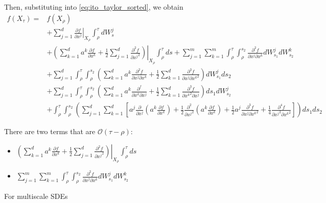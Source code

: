 \documentclass[12pt]{article}
\begin{document}
Then, substituting into \eqref{eq:ito_taylor_sorted}, we obtain
\begin{equation}
\begin{aligned}
f( X_\tau) = & f( X_\rho) \\
&+ \sum_{j=1}^d \left. \frac{\partial f}{\partial x^j} \right|_{X_\rho}  \int_{\rho}^{\tau}  dW_s^j \\ &
+  \left. \left( \sum_{k=1}^d a^k \frac{\partial f}{\partial x^k} + \frac{1}{2} \sum_{j=1}^d \frac{\partial^2 f}{\partial {x^j}^2} \right) \right|_{X_\rho} \int_{\rho}^{\tau} ds + \sum_{j=1}^m \sum_{k=1}^m \int_{\rho}^{\tau} \int_{\rho}^{s_2} \frac{\partial^2 f}{\partial x^j \partial x^k} dW_{s_1}^j dW_{s_2}^k \\
& + \sum_{j=1}^d  \int_{\rho}^{\tau} \int_{\rho}^{s_2} \left( \sum_{k=1}^d a^k \frac{\partial^2 f}{\partial x^j \partial x^k} + \frac{1}{2} \sum_{k=1}^d \frac{\partial^3 f}{\partial x^j \partial {x^k}^2} \right) dW_{s_1}^j ds_2 \\
& + \sum_{j=1}^d  \int_{\rho}^{\tau} \int_{\rho}^{s_2} \left( \sum_{k=1}^d a^k \frac{\partial^ f}{\partial x^k \partial x^j} + \frac{1}{2} \sum_{k=1}^d  \frac{\partial^3 f}{\partial {x^k}^2 \partial x^j} \right) ds_1 dW_{s_2}^j  \\
& + \int_{\rho}^{\tau} \int_{\rho}^{s_2} \left( \sum_{j=1}^d \sum_{k=1}^d \left[ a^j \frac{\partial}{\partial x^j}\left( a^k \frac{\partial f}{\partial x^k} \right) + \frac{1}{2} \frac{\partial^2}{\partial {x^j}^2} \left( a^k \frac{\partial f}{\partial x^k} \right) + \frac{1}{2} a^j \frac{\partial^3 f}{\partial x^j \partial {x^k}^2} + \frac{1}{4} \frac{\partial^4 f}{\partial {x^j}^2 \partial {x^k}^2} \right] \right)  ds_1 ds_2
\end{aligned}
\end{equation}

There are two terms that are $\mathcal{O}(\tau - \rho)$:
\begin{itemize}
\item $\left. \left( \sum_{k=1}^d a^k \frac{\partial f}{\partial x^k} + \frac{1}{2} \sum_{j=1}^d \frac{\partial^2 f}{\partial {x^j}^2} \right) \right|_{X_\rho} \int_{\rho}^{\tau} ds $
\item $ \sum_{j=1}^m \sum_{k=1}^m \int_{\rho}^{\tau} \int_{\rho}^{s_2} \frac{\partial^2 f}{\partial x^j \partial x^k} dW_{s_1}^j dW_{s_2}^k $
\end{itemize}

For multiscale SDEs
\end{document}
